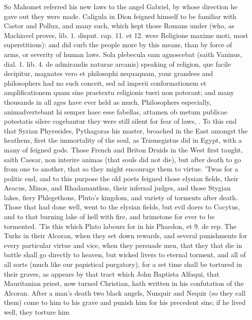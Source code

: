 {So Mahomet referred his new laws to the angel Gabriel, by whose
direction he gave out they were made. Caligula in Dion feigned himself
to be familiar with Castor and Pollux, and many such, which kept those
Romans under (who, as Machiavel proves, lib. 1. disput. cap. 11. et 12.
were Religione maxime moti, most superstitious): and did curb the
people more by this means, than by force of arms, or severity of human
laws. Sola plebecula eam agnoscebat (saith Vaninus, dial. 1. lib. 4. de
admirandis naturae arcanis) speaking of religion, que facile decipitur,
magnates vero et philosophi nequaquam, your grandees and philosophers
had no such conceit, sed ad imperii conformationem et amplificationem
quam sine praetextu religionis tueri non poterant; and many thousands
in all ages have ever held as much, Philosophers especially,
animadvertebant hi semper haec esse fabellas, attamen ob metum publicae
potestatis silere cogebantur they were still silent for fear of laws,
\etc{}. To this end that Syrian Phyresides, Pythagoras his master, broached
in the East amongst the heathens, first the immortality of the soul, as
Trismegistus did in Egypt, with a many of feigned gods. Those French
and Briton Druids in the West first taught, saith Caesar, non
interire animas (that souls did not die), but after death to go from
one to another, that so they might encourage them to virtue. 'Twas for
a politic end, and to this purpose the old poets feigned those
elysian fields, their Aeacus, Minos, and Rhadamanthus, their infernal
judges, and those Stygian lakes, fiery Phlegethons, Pluto's kingdom,
and variety of torments after death. Those that had done well, went to
the elysian fields, but evil doers to Cocytus, and to that burning lake
of hell with fire, and brimstone for ever to be tormented. 'Tis
this which Plato labours for in his Phaedon, et 9. de rep. The
Turks in their Alcoran, when they set down rewards, and several
punishments for every particular virtue and vice, when they
persuade men, that they that die in battle shall go directly to heaven,
but wicked livers to eternal torment, and all of all sorts (much like
our papistical purgatory), for a set time shall be tortured in their
graves, as appears by that tract which John Baptista Alfaqui, that
Mauritanian priest, now turned Christian, hath written in his
confutation of the Alcoran. After a man's death two black angels,
Nunquir and Nequir (so they call them) come to him to his grave and
punish him for his precedent sins; if he lived well, they torture him
}
